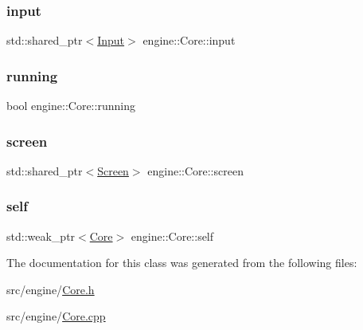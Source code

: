 \subsubsection{\texorpdfstring{input}{input}}
{\footnotesize\ttfamily std\+::shared\+\_\+ptr$<$\mbox{\hyperlink{classengine_1_1_input}{Input}}$>$ engine\+::\+Core\+::input\hspace{0.3cm}{\ttfamily [private]}}

\mbox{\label{classengine_1_1_core_a0e72beaea8705d13ae972dc1bf4cc300}} 
\subsubsection{\texorpdfstring{running}{running}}
{\footnotesize\ttfamily bool engine\+::\+Core\+::running\hspace{0.3cm}{\ttfamily [private]}}

\mbox{\label{classengine_1_1_core_a34a2a57e4555db8ce7577f257f680e90}} 
\subsubsection{\texorpdfstring{screen}{screen}}
{\footnotesize\ttfamily std\+::shared\+\_\+ptr$<$\mbox{\hyperlink{classengine_1_1_screen}{Screen}}$>$ engine\+::\+Core\+::screen\hspace{0.3cm}{\ttfamily [private]}}

\mbox{\label{classengine_1_1_core_a89121092947e17412760fe93a5967d8f}} 
\subsubsection{\texorpdfstring{self}{self}}
{\footnotesize\ttfamily std\+::weak\+\_\+ptr$<$\mbox{\hyperlink{classengine_1_1_core}{Core}}$>$ engine\+::\+Core\+::self\hspace{0.3cm}{\ttfamily [private]}}



The documentation for this class was generated from the following files\+:\begin{DoxyCompactItemize}
\item 
src/engine/\mbox{\hyperlink{_core_8h}{Core.\+h}}\item 
src/engine/\mbox{\hyperlink{_core_8cpp}{Core.\+cpp}}\end{DoxyCompactItemize}

